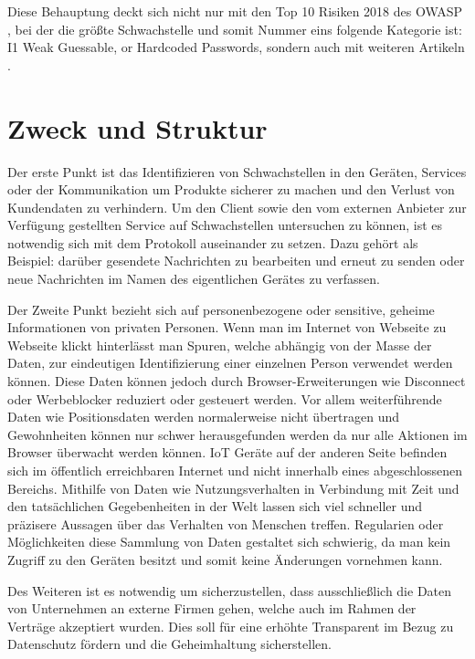 Diese Behauptung deckt sich nicht nur mit den Top 10 Risiken 2018 des \ac{OWASP} \cite{guzman_2019}, bei der die größte Schwachstelle und somit Nummer eins folgende Kategorie ist: \glqq I1 Weak Guessable, or Hardcoded Passwords\grqq{}, sondern auch mit weiteren Artikeln \cite{eckstein_2018}.

\section{Zweck und Struktur}

    Der erste Punkt ist das Identifizieren von Schwachstellen in den Geräten, Services oder der Kommunikation um Produkte sicherer zu machen und den Verlust von Kundendaten zu verhindern.
    Um den Client sowie den vom externen Anbieter zur Verfügung gestellten Service auf Schwachstellen untersuchen zu können, ist es notwendig sich mit dem Protokoll auseinander zu setzen. Dazu gehört als Beispiel: darüber gesendete Nachrichten zu bearbeiten und erneut zu senden oder neue Nachrichten im Namen des eigentlichen Gerätes zu verfassen.
    
    Der Zweite Punkt bezieht sich auf personenbezogene oder sensitive, geheime Informationen von privaten Personen.
    Wenn man im Internet von Webseite zu Webseite klickt hinterlässt man Spuren, welche abhängig von der Masse der Daten, zur eindeutigen Identifizierung einer einzelnen Person verwendet werden können. %
    Diese Daten können jedoch durch Browser-Erweiterungen wie Disconnect oder Werbeblocker reduziert oder gesteuert werden. Vor allem weiterführende Daten wie Positionsdaten werden normalerweise nicht übertragen und Gewohnheiten können nur schwer herausgefunden werden da nur alle Aktionen im Browser überwacht werden können.
    \ac{IoT} Geräte auf der anderen Seite befinden sich im öffentlich erreichbaren Internet und nicht innerhalb eines abgeschlossenen Bereichs. Mithilfe von Daten wie Nutzungsverhalten in Verbindung mit Zeit und den tatsächlichen Gegebenheiten in der Welt lassen sich viel schneller und präzisere Aussagen über das Verhalten von Menschen treffen. Regularien oder Möglichkeiten diese Sammlung von Daten gestaltet sich schwierig, da man kein Zugriff zu den Geräten besitzt und somit keine Änderungen vornehmen kann.
    
    Des Weiteren ist es notwendig um sicherzustellen, dass ausschließlich  die Daten von Unternehmen an externe Firmen gehen, welche auch im Rahmen der Verträge akzeptiert wurden. Dies soll für eine erhöhte Transparent im Bezug zu Datenschutz fördern und die Geheimhaltung sicherstellen.
    
